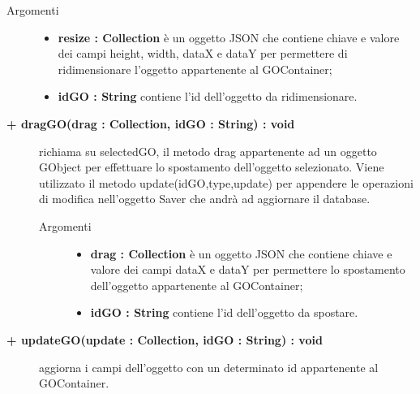 \begin{description}
\begin{description}
\begin{description}
			\item[Argomenti] \hfill
				\begin{itemize}
					\item \textbf{resize : Collection			} \hfill
					è un oggetto JSON che contiene chiave e valore dei campi height, width, dataX e dataY per permettere di ridimensionare l'oggetto appartenente al GOContainer;
					\item \textbf{idGO : String			} \hfill
					contiene l'id dell'oggetto da ridimensionare.
				\end{itemize}

\end{description}

\end{description}

\begin{description}
		\item[\textbf{\color{blue}+ dragGO(drag : Collection, idGO : String) : void			}] \hfill
			richiama su selectedGO, il metodo drag appartenente ad un oggetto GObject per effettuare lo spostamento dell'oggetto selezionato. Viene utilizzato il metodo update(idGO,type,update) per appendere le operazioni di modifica nell'oggetto Saver che andrà ad aggiornare il database.    

\begin{description}
			\item[Argomenti] \hfill
				\begin{itemize}
					\item \textbf{drag : Collection			} \hfill
					è un oggetto JSON che contiene chiave e valore dei campi dataX e dataY per permettere lo spostamento dell'oggetto appartenente al GOContainer;
					\item \textbf{idGO : String			} \hfill
					contiene l'id dell'oggetto da spostare.
				\end{itemize}

\end{description}

\end{description}

\begin{description}
		\item[\textbf{\color{blue}+ updateGO(update : Collection, idGO : String) : void			}] \hfill
			aggiorna i campi dell'oggetto con un determinato id appartenente al GOContainer.  


\end{description}
\end{description}
